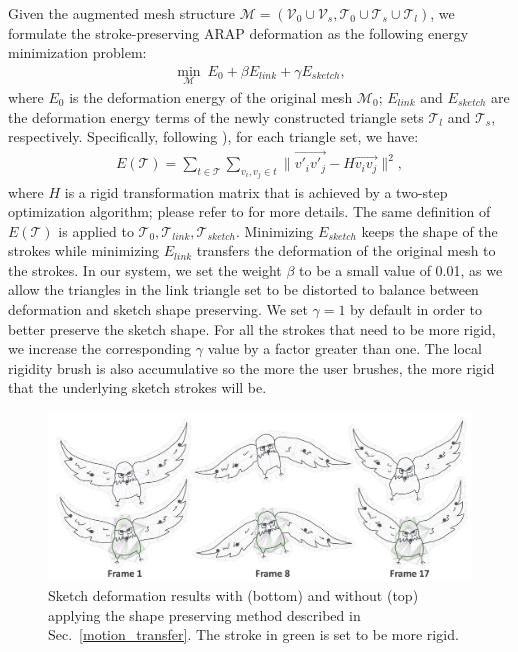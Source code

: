 Given the augmented mesh structure $\mathcal{M}=(\mathcal{V}_0 \cup \mathcal{V}_s, \mathcal{T}_0\cup \mathcal{T}_s\cup \mathcal{T}_l)$, we formulate the stroke-preserving ARAP deformation as the following energy minimization problem: 
\begin{align}\label{eqn:deformationE}
	\min_\mathcal{M} \ E_0 + \beta E_{link} + \gamma E_{sketch},
\end{align}
where $ E_0 $ is the deformation energy of the original mesh $ \mathcal{M}_0 $; $ E_{link} $ and $ E_{sketch} $ are the deformation energy terms of the newly constructed triangle sets $\mathcal{T}_l $ and $\mathcal{T}_s $, respectively. 
Specifically, following \cite{Igarashi:2005}), for each triangle set, we have:
\begin{align}
 E(\mathcal{T}) = \sum_{t\in \mathcal{T}} \sum_{v_i, v_j \in t} \|\overrightarrow{v'_iv'_j} - H\overrightarrow{v_iv_j}\|^2 ,
 \end{align}
  where $ H $ is a rigid transformation matrix that is achieved by a two-step optimization algorithm; please refer to \cite{Igarashi:2005} for more details.
The same definition of $E(\mathcal{T})$ is applied to $\mathcal{T}_0, \mathcal{T}_{link}, \mathcal{T}_{sketch}$.
 Minimizing $ E_{sketch} $ keeps the shape of the strokes while minimizing $ E_{link} $ transfers the deformation of the original mesh to the strokes. 
In our system, we set the weight $ \beta $ to be a small value of 0.01, as we allow the triangles in the link triangle set to be distorted to balance between deformation and sketch shape preserving. We set $ \gamma = 1$ by default in order to better preserve the sketch shape. 
For all the strokes that need to be more rigid, we increase the corresponding $\gamma$ value by a factor greater than one. The local rigidity brush is also accumulative so the more the user brushes, the more rigid that the underlying sketch strokes will be. 




\begin{figure}
	\centering
	\includegraphics[width=\linewidth]{images/deformation}
	\caption{Sketch deformation results with (bottom) and without (top) applying the shape preserving method described in Sec.~\ref{motion_transfer}. The stroke in green is set to be more rigid.}
	\label{fig:deformation}
\end{figure}

